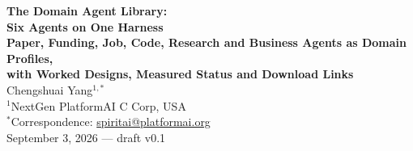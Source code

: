 
\begin{center}
{\LARGE\bfseries The Domain Agent Library:}\\[6pt]
{\LARGE\bfseries Six Agents on One Harness}\\[8pt]
{\large\bfseries Paper, Funding, Job, Code, Research and Business Agents as Domain Profiles,\\[2pt]
with Worked Designs, Measured Status and Download Links}\\[16pt]
{\large Chengshuai Yang$^{1,*}$}\\[5pt]
{\normalsize $^{1}$NextGen PlatformAI C Corp, USA}\\[4pt]
{\normalsize $^{*}$Correspondence: \href{mailto:spiritai@platformai.org}{spiritai@platformai.org}}\\[10pt]
{\small September 3, 2026 --- draft v0.1}
\end{center}

